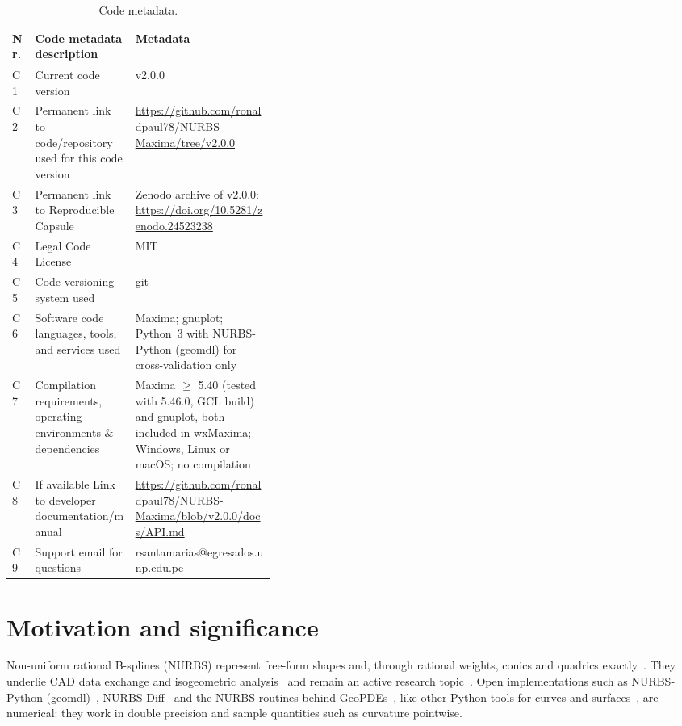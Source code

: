 \documentclass[preprint,12pt]{elsarticle}
\begin{document}
\begin{table}[H]
\small
\begin{tabularx}{\linewidth}{@{}l>{\raggedright\arraybackslash}p{0.38\linewidth}>{\raggedright\arraybackslash}X@{}}
\toprule
Nr. & Code metadata description & Metadata \\
\midrule
C1 & Current code version & v2.0.0 \\
C2 & Permanent link to code/repository used for this code version & \url{https://github.com/ronaldpaul78/NURBS-Maxima/tree/v2.0.0} \\
C3 & Permanent link to Reproducible Capsule & Zenodo archive of v2.0.0: \url{https://doi.org/10.5281/zenodo.24523238} \\
C4 & Legal Code License & MIT \\
C5 & Code versioning system used & git \\
C6 & Software code languages, tools, and services used & Maxima; gnuplot; Python~3 with NURBS-Python (geomdl) for cross-validation only \\
C7 & Compilation requirements, operating environments \& dependencies & Maxima $\geq$ 5.40 (tested with 5.46.0, GCL build) and gnuplot, both included in wxMaxima; Windows, Linux or macOS; no compilation \\
C8 & If available Link to developer documentation/manual & \url{https://github.com/ronaldpaul78/NURBS-Maxima/blob/v2.0.0/docs/API.md} \\
C9 & Support email for questions & rsantamarias@egresados.unp.edu.pe \\
\bottomrule
\end{tabularx}
\caption{Code metadata.}
\label{tab:metadata}
\end{table}

\section{Motivation and significance}
\label{sec:motivation}

Non-uniform rational B-splines (NURBS) represent free-form shapes and, through rational weights, conics and quadrics exactly~\cite{PieglTiller1987,Piegl1991,Farin1992,PieglTiller1997,Farin1999,Farin2002,Salomon2006,CorderoCortes2002}. They underlie CAD data exchange and isogeometric analysis~\cite{Hughes2005,Cottrell2009} and remain an active research topic~\cite{FernandezJambrina2020,Taheri2022,Cashman2009}. Open implementations such as NURBS-Python (geomdl)~\cite{Bingol2019}, NURBS-Diff~\cite{Prasad2022} and the NURBS routines behind GeoPDEs~\cite{deFalco2011}, like other Python tools for curves and surfaces~\cite{Johansson2015,Pereira2024}, are numerical: they work in double precision and sample quantities such as curvature pointwise.
\end{document}
